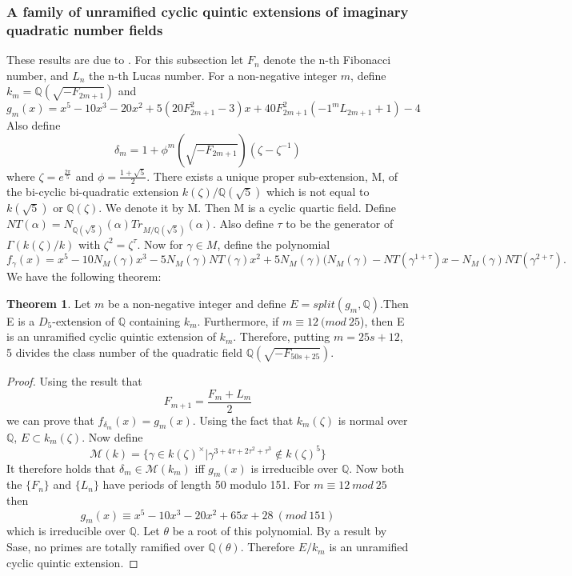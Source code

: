 \documentclass[12pt]{extarticle}
\newcommand{\Q}{\mathbb{Q}}
\newcommand{\<}{\langle}
\renewcommand{\>}{\rangle}
\theoremstyle{definition}
\newtheorem{theorem}{Theorem}
\begin{document}
\subsubsection{A family of unramified cyclic quintic extensions of imaginary quadratic number fields}
These results are due to \cite{KISH}. For this subsection let $F_n$ denote the n-th Fibonacci number, and $L_n$ the n-th Lucas number. For a non-negative integer $m$, define $k_m = \Q(\sqrt{-F_{2m+1}})$ and \begin{equation}
    g_m(x) = x^5 - 10x^3  -20x^2 + 
    5(20F^2_{2m+1} - 3)x
    + 40F^2_{2m+1}(-1^{m}L_{2m+1} + 1)- 4
\end{equation} 
Also define \begin{equation}
    \delta_m = 1+\phi^m(\sqrt{-F_{2m+1}})(\zeta-\zeta^{-1})
\end{equation} where $\zeta = e^{\frac{2\pi}{5}}$ and $\phi = \frac{1+\sqrt{5}}{2}$. There exists a unique proper sub-extension, M, of the bi-cyclic bi-quadratic
extension $k(\zeta)/\Q(\sqrt{5})$ which is not equal to $k(\sqrt{5})$ or $\Q(\zeta)$. We denote it by M. Then M is a cyclic quartic field. Define $NT(\alpha) = N_{\Q(\sqrt{5})}(\alpha)Tr_{M/\Q(\sqrt{5})}(\alpha)$. Also define $\tau$ to be the generator of $\Gamma(k(\zeta)/k)$ with $\zeta^2=\zeta^\tau$.
Now for $\gamma \in M$, define the polynomial \begin{equation}
    f_\gamma(x) = x^5 - 10N_M(\gamma)x^3 - 5N_M(\gamma)NT (\gamma)x^2
+ 5N_M(\gamma)(N_M(\gamma) - NT(\gamma^{1+\tau})x - N_M(\gamma)NT(\gamma^{2+\tau}) 
.
\end{equation}
We have the following theorem: \begin{theorem}
    Let $m$ be a non-negative integer and define $E = split(g_m,\Q)$.Then E is a $D_5$-extension
of $\Q$ containing $k_m$. Furthermore, if $m \equiv 12 \:(mod\:25$), then E is an unramified cyclic quintic extension of $k_m$. Therefore, putting $m = 25s + 12$, 5 divides the class number of the quadratic field $\Q(\sqrt{-F_{50s+25}})$.
\end{theorem}
\begin{proof}
Using the result that \begin{equation}
    F_{m+1}= \frac{F_m + L_m}{2}
\end{equation}
we can prove that $f_{\delta_m}(x) = g_m(x)$. Using the fact that $k_m(\zeta)$ is normal over $\Q$, $E\subset k_m(\zeta)$. Now define  \begin{equation}
    \mathcal{M}(k)=\{\gamma \in k(\zeta)^{\times}|\gamma^{3+4\tau+2\tau^{2}+\tau^3}\notin k(\zeta)^5\}
\end{equation}
It therefore holds that $\delta_m \in \mathcal{M}(k_m)$ iff $g_m(x)$ is irreducible over $\Q$. Now both the $\{F_n\}$ and $\{L_n\}$ have periods of length 50 modulo 151. For $m\equiv12 \: mod \: 25$ then \begin{equation}
    g_m(x) \equiv x^5 - 10x^3 - 20x^2 + 65x + 28\:(mod \:151)
\end{equation} which is irreducible over $\Q$. Let $\theta$ be a root of this polynomial. By a result by Sase, no primes are totally ramified over $\Q(\theta)$. Therefore $E/k_m$ is an unramified cyclic quintic extension. 
\end{proof}
\end{document}
